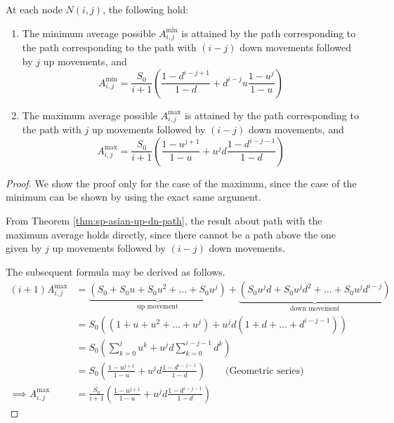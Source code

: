 \begin{crr}
	\label{crr:sp-asian-up-dn-path}
	At each node $ N(i,j) $, the following hold:
	\begin{enumerate}
	\item The minimum average possible $ A_{i,j}^{\min} $ is attained by the path corresponding to the path corresponding to the path with $(i-j)$ down movements followed by $j$ up movements, and
		\begin{equation}	\label{eq:sp-asian-Amin}
			A_{i,j}^{\min} = \frac{S_0}{i+1} \left( \frac{1 - d^{i-j+1}}{1-d} + d^{i-j} u \frac{1 - u^{j}}{1-u} \right)
		\end{equation}
	\item The maximum average possible $ A_{i,j}^{\max} $ is attained by the path corresponding to the path with $j$ up movements followed by $(i-j)$ down movements, and
		\begin{equation} \label{eq:sp-asian-Amax}
			A_{i,j}^{\max} = \frac{S_0}{i+1} \left( \frac{1 - u^{j+1}}{1-u} + u^{j} d \frac{1 - d^{i-j-1}}{1-d} \right)
		\end{equation}
	\end{enumerate}
\end{crr}

\begin{proof}
	We show the proof only for the case of the maximum, since the case of the minimum can be shown by using the exact same argument.
	
	From Theorem \ref{thm:sp-asian-up-dn-path}, the result about path with the maximum average holds directly, since there cannot be a path above the one given by $j$ up movements followed by $(i-j)$ down movements.
	
	The subsequent formula may be derived as follows.
	\begin{align*}
		(i+1) A_{i,j}^{\max} &= \underbrace{ ( S_0 + S_0 u + S_0 u^2 + \dots + S_0 u^j ) }_\text{up movement} + \underbrace{ ( S_0 u^j d + S_0 u^j d^2 + \dots + S_0 u^j d^{i-j} ) }_\text{down movement} \\
												 &= S_0 ( (1 + u + u^2 + \dots + u^j ) + u^j d ( 1 + d + \dots + d^{i-j-1} ) ) \\
												 &= S_0 \left( \sum_{k=0}^j u^k + u^j d \sum_{k=0}^{i-j-1} d^k \right) \\
												 &= S_0 \left( \frac{1 - u^{j+1}}{1-u} + u^{j} d \frac{1 - d^{i-j-1}}{1-d} \right) \qquad \text{(Geometric series)} \\
		\implies A_{i,j}^{\max} &= \frac{S_0}{i+1} \left( \frac{1 - u^{j+1}}{1-u} + u^{j} d \frac{1 - d^{i-j-1}}{1-d} \right)
	\end{align*}
\end{proof}

